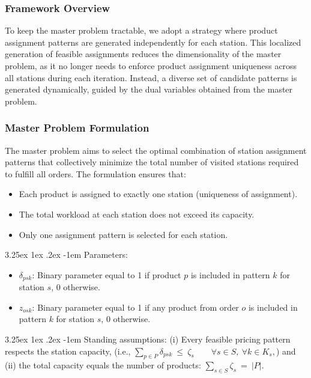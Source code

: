\documentclass[11pt]{elsarticle}
\makeatletter
\renewcommand\paragraph{\@startsection{paragraph}{4}{\z@}
  {3.25ex \@plus1ex \@minus.2ex}
  {-1em}
  {\normalfont\normalsize\itshape}}
\makeatother
\begin{document}
\subsubsection{Framework Overview}

To keep the master problem tractable, we adopt a strategy where product assignment patterns are generated independently for each station. This localized generation of feasible assignments reduces the dimensionality of the master problem, as it no longer needs to enforce product assignment uniqueness across all stations during each iteration. Instead, a diverse set of candidate patterns is generated dynamically, guided by the dual variables obtained from the master problem.




\subsubsection{Master Problem Formulation}

The master problem aims to select the optimal combination of station assignment patterns that collectively minimize the total number of visited stations required to fulfill all orders. The formulation ensures that:

\begin{itemize}
    \item Each product is assigned to exactly one station (uniqueness of assignment).
    \item The total workload at each station does not exceed its capacity.
    \item Only one assignment pattern is selected for each station.
\end{itemize}


\paragraph{Parameters:}
\begin{itemize}
    \item $\delta_{psk}$: Binary parameter equal to 1 if product $p$ is included in pattern $k$ for station $s$, 0 otherwise.
    \item $z_{osk}$: Binary parameter equal to 1 if any product from order $o$ is included in pattern $k$ for station $s$, 0 otherwise.
\end{itemize}

\paragraph{Standing assumptions:}
(i) Every feasible pricing pattern respects the station capacity, (i.e.,
\(
\sum_{p\in P}\delta_{psk}\ \le\ \zeta_s \qquad \forall s\in S,\ \forall k\in K_s,
\))
and (ii) the total capacity equals the number of products:
\(
\sum_{s\in S}\zeta_s\ =\ |P|.
\)
\end{document}
